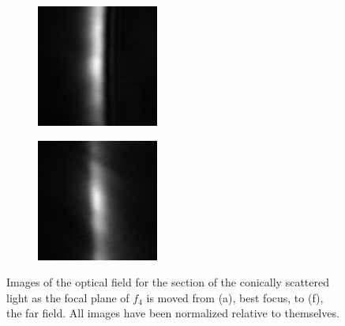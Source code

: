 \begin{figure}[ht]
\begin{subfigure}[b]{4cm}
\includegraphics[width=4cm,keepaspectratio]{interference/figures/move/321-8.png}
\caption{}
\end{subfigure}
\begin{subfigure}[b]{4cm}
\includegraphics[width=4cm,keepaspectratio]{interference/figures/move/321-9.png}
\caption{}
\end{subfigure}
\caption{Images of the optical field for the section of the conically
scattered light as the focal plane of $f_4$ is moved from (a), best focus,
to (f), the far field.  All images have been normalized relative to
themselves.}
\label{fig:321up}
\end{figure}

